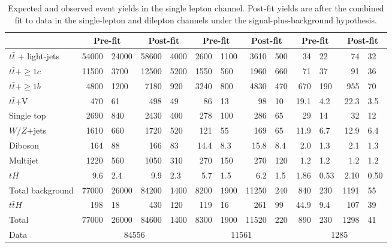 \begin{table}[htbp]
\begin{footnotesize}
{\begin{tabular}{|l ||  r@{$~\pm~$}l |  r@{$~\pm~$}l ||  r@{$~\pm~$}l  | r@{$~\pm~$}l || r@{$~\pm~$}l | r@{$~\pm~$}l |}
    & \multicolumn{2}{c|}{Pre-fit} & \multicolumn{2}{c||}{Post-fit} & \multicolumn{2}{c|}{Pre-fit} & \multicolumn{2}{c||}{Post-fit} & \multicolumn{2}{c|}{Pre-fit} & \multicolumn{2}{c|}{Post-fit} \\
    \hline
    $t\bar{t}$ + light-jets & 54000&24000 &  58600&4000  & 2600&1100 &  3610&500  & 34&22 & 74&32 \\
    $t\bar{t}+\ge1c$   & 11500&3700  &  12500&5200 & 1550&560 &  1960&660 & 71&37     &  91&36  \\
    $t\bar{t}+\ge1b$   & 4800&1200   &  7180&920   & 3240&800 &  4830&470 & 670&190   &  955&70  \\
    $t\bar{t}$+V & 470&61      &  498&49     & 86&13    &  98&10    & 19.1&4.2  &  22.3&3.5  \\
    Single top & 2690&840    &  2430&400   & 278&100  &  286&65   & 29&14     &  32&12  \\
    $W/Z$+jets & 1610&660    &  1720&520   & 121&55   &  169&65   & 11.9&6.7  &  12.9&6.4  \\
    Diboson    & 164&88      & 166&83      & 14.4&8.3 & 15.8&8.4  & 2.0&1.3   & 2.1&1.3 \\
    Multijet & 1220&560    & 1050&310    & 270&150  & 270&120   & 1.2&1.2   & 1.2&1.2 \\
    $tH$       & 9.6&2.4     &  9.9&2.3    &  5.7&1.5 &  6.2&1.5  & 1.86&0.53 & 2.10&0.50  \\
    \hline
    Total background & 77000&26000 &  84200&1400  & 8200&1900 &  11250&240  & 840&230 & 1191&55 \\
    \hline
    $t\bar{t}H$     & 198&18      &   430&120   & 119&16   &   261&99  & 44.9&9.4  &    107&39   \\
    \hline
    Total            & 77000&26000 &  84600&1400  & 8300&1900 &  11520&220  & 890&230 & 1298&41 \\
    \hline
    Data & \multicolumn{4}{c||}{84556} & \multicolumn{4}{c||}{11561} & \multicolumn{4}{c|}{1285} \\
    \hline
  \end{tabular}
  }\end{footnotesize}
 \captionsetup{width=0.85\textwidth}  \caption{\small Expected and observed event yields in the single lepton channel. Post-fit yields are after the combined fit to data in the single-lepton and dilepton channels under the signal-plus-background hypothesis.
}
\end{table}
